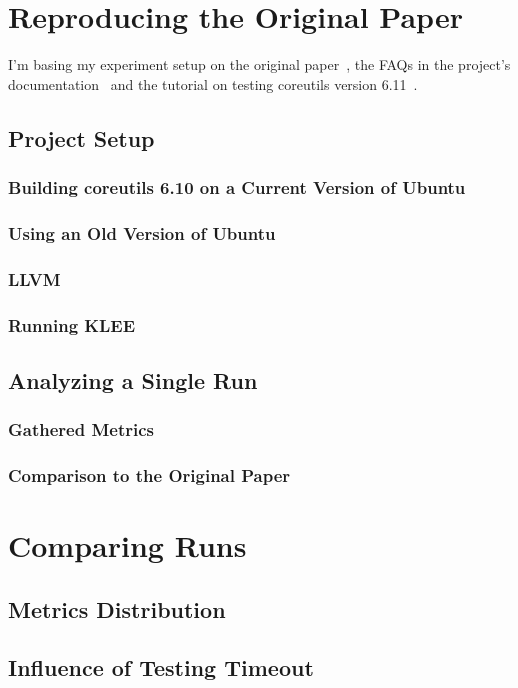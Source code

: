 \documentclass{article}
\let\savedCite=\cite
\renewcommand{\cite}{\unskip~\savedCite}
\begin{document}
\begin{multicols}{2}
    \section{Reproducing the Original Paper}
    \label{Reproducing}
    I'm basing my experiment setup on the original paper\cite{KLEE}, the FAQs in the project's documentation\cite{KLEEFAQ} and the tutorial on testing coreutils version 6.11\cite{KLEETutorial}.

    \subsection{Project Setup}
    \subsubsection{Building coreutils 6.10 on a Current Version of Ubuntu}
    \subsubsection{Using an Old Version of Ubuntu}
    \subsubsection{LLVM}
    \subsubsection{Running KLEE}

    \subsection{Analyzing a Single Run}
    \subsubsection{Gathered Metrics}
    \subsubsection{Comparison to the Original Paper}

    \section{Comparing Runs}
    \label{Timeouts}
    \subsection{Metrics Distribution}
    \subsection{Influence of Testing Timeout}


\end{multicols}
\end{document}

